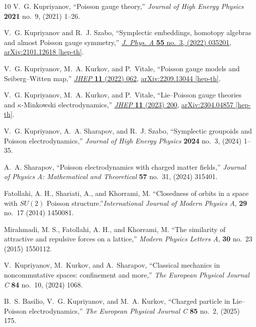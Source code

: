 \documentclass[12pt,a4paper]{article}
\numberwithin{equation}{section}
\theoremstyle{theorem}
\theoremstyle{remark}
\begin{document}
\begin{thebibliography}{10}
V.~G. Kupriyanov, ``Poisson gauge theory,'' {\em Journal of High Energy Physics} {\bfseries 2021} no.~9, (2021) 1--26.

V.~G. Kupriyanov and R.~J. Szabo, ``{Symplectic embeddings, homotopy algebras and almost Poisson gauge symmetry},'' \href{http://dx.doi.org/10.1088/1751-8121/ac411c}{{\em J. Phys. A} {\bfseries 55} no.~3, (2022) 035201}, \href{http://arxiv.org/abs/2101.12618}{{\ttfamily arXiv:2101.12618 [hep-th]}}.

V.~G. Kupriyanov, M.~A. Kurkov, and P.~Vitale, ``{Poisson gauge models and Seiberg--Witten map},'' \href{http://dx.doi.org/10.1007/JHEP11(2022)062}{{\em JHEP} {\bfseries 11} (2022) 062}, \href{http://arxiv.org/abs/2209.13044}{{\ttfamily arXiv:2209.13044 [hep-th]}}.

V.~G. Kupriyanov, M.~A. Kurkov, and P.~Vitale, ``{Lie--Poisson gauge theories and $\kappa$-Minkowski electrodynamics},'' \href{http://dx.doi.org/10.1007/JHEP11(2023)200}{{\em JHEP} {\bfseries 11} (2023) 200}, \href{http://arxiv.org/abs/2304.04857}{{\ttfamily arXiv:2304.04857 [hep-th]}}.

V.~G. Kupriyanov, A.~A. Sharapov, and R.~J. Szabo, ``{Symplectic groupoids and Poisson electrodynamics},'' {\em Journal of High Energy Physics} {\bfseries 2024} no.~3, (2024) 1--35.

A.~A. Sharapov, ``Poisson electrodynamics with charged matter fields,'' {\em Journal of Physics A: Mathematical and Theoretical} {\bfseries 57} no.~31, (2024) 315401.

 Fatollahi, A. H., Shariati, A., and Khorrami, M.  ``Closedness of orbits in a space with $SU(2)$ Poisson structure.''{\em International Journal of Modern Physics A}, {\bfseries 29} no.~17 (2014) 1450081.

 Mirahmadi, M. S., Fatollahi, A. H., and  Khorrami, M.  ``The similarity of attractive and repulsive forces on a lattice,'' {\em Modern Physics Letters A}, {\bfseries 30} no.~23 (2015) 1550112.


V.~Kupriyanov, M.~Kurkov, and A.~Sharapov, ``Classical mechanics in noncommutative spaces: confinement and more,'' {\em The European Physical Journal C} {\bfseries 84} no.~10, (2024) 1068.

B.~S. Basilio, V.~G. Kupriyanov, and M.~A. Kurkov, ``{Charged particle in Lie--Poisson electrodynamics},'' {\em The European Physical Journal C} {\bfseries 85} no.~2, (2025) 175.


\end{thebibliography}
\end{document}
